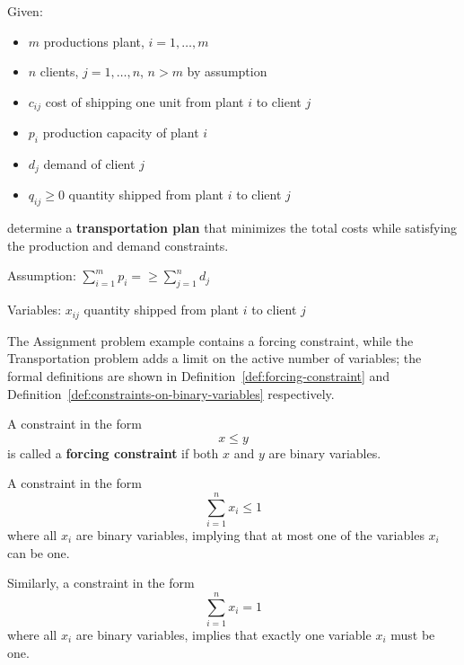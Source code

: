 \documentclass[english]{article}
\begin{document}
\begin{example}
  \label{ex:transportation-problem}
  Given:
  \begin{itemize}
    \item \(m\) productions plant, \(i = 1, \dots, m\)
    \item \(n\) clients, \(j = 1, \dots, n\), \(n > m\) by assumption
    \item \(c_{ij}\) cost of shipping one unit from plant \(i\) to client \(j\)
    \item \(p_i\) production capacity of plant \(i\)
    \item \(d_j\) demand of client \(j\)
    \item \(q_{ij} \geq 0\) quantity shipped from plant \(i\) to client \(j\)
  \end{itemize}
  determine a \textbf{transportation plan} that minimizes the total costs while satisfying the production and demand constraints.

  Assumption: \(\displaystyle \sum_{i=1}^m p_i = \geq \sum_{j=1}^{n} d_j\)

  Variables: \(x_{ij}\) quantity shipped from plant \(i\) to client \(j\)

\end{example}

The Assignment problem example contains a forcing constraint, while the Transportation problem adds a limit on the active number of variables;
the formal definitions are shown in Definition~\ref{def:forcing-constraint} and Definition~\ref{def:constraints-on-binary-variables} respectively.

\begin{definition}
  \label{def:forcing-constraint}
  A constraint in the form
  \[ \displaystyle x \leq y\]
  is called a \textbf{forcing constraint} if both \(x\) and \(y\) are binary variables.
\end{definition}

\begin{definition}
  \label{def:constraints-on-binary-variables}
  A constraint in the form
  \[ \displaystyle \sum_{i=1}^n x_i \leq 1 \]
  where all \(x_i\) are binary variables, implying that at most one of the variables \(x_i\) can be one.

  Similarly, a constraint in the form
  \[ \displaystyle \sum_{i=1}^n x_i = 1 \]
  where all \(x_i\) are binary variables, implies that exactly one variable \(x_i\) must be one.
\end{definition}
\end{document}

